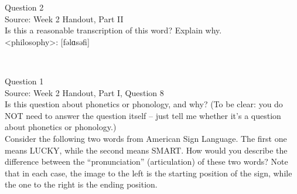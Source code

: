 \documentclass[12pt]{article}
\begin{document}
\newpage

{\large Question 2}\\

Source: Week 2 Handout, Part II\\

Is this a reasonable transcription of this word? Explain why.\\

<philosophy>: {[fəlɑsəfi]}


\newpage

\begin{center}
\textbf{{\color{red}{\HUGE END OF EXAM}}}\\

\end{center}
\newpage

\begin{center}
\textbf{{\color{blue}{\HUGE START OF EXAM\\}}}

\textbf{{\color{blue}{\HUGE Student ID: 89930\\}}}

\textbf{{\color{blue}{\HUGE 9:40\\}}}

\end{center}
\newpage

{\large Question 1}\\

Source: Week 2 Handout, Part I, Question 8\\

Is this question about phonetics or phonology, and why? (To be clear: you do NOT need to answer the question itself -- just tell me whether it's a question about phonetics or phonology.)\\

Consider the following two words from American Sign Language. The first one means LUCKY, while the second means SMART. How would you describe the difference between the ``pronunciation'' (articulation) of these two words? Note that in each case, the image to the left is the starting position of the sign, while the one to the right is the ending position.
\end{document}
